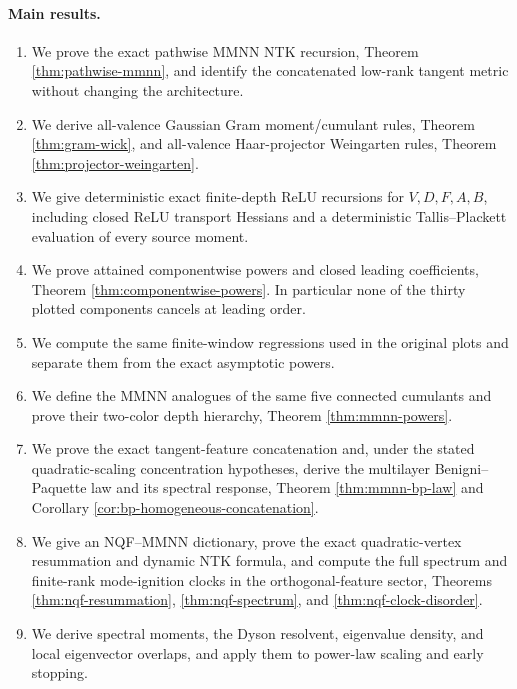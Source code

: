 \documentclass{article}
\begin{document}
\paragraph{Main results.}
\begin{enumerate}[leftmargin=1.55em]
\item We prove the exact pathwise MMNN NTK recursion, Theorem
\ref{thm:pathwise-mmnn}, and identify the concatenated low-rank tangent
metric without changing the architecture.
\item We derive all-valence Gaussian Gram moment/cumulant rules, Theorem
\ref{thm:gram-wick}, and all-valence Haar-projector Weingarten rules,
Theorem \ref{thm:projector-weingarten}.
\item We give deterministic exact finite-depth ReLU recursions for
\(V,D,F,A,B\), including closed ReLU transport Hessians and a deterministic
Tallis--Plackett evaluation of every source moment.
\item We prove attained componentwise powers and closed leading
coefficients, Theorem \ref{thm:componentwise-powers}.  In particular none of
the thirty plotted components cancels at leading order.
\item We compute the same finite-window regressions used in the original
plots and separate them from the exact asymptotic powers.
\item We define the MMNN analogues of the same five connected cumulants and
prove their two-color depth hierarchy, Theorem \ref{thm:mmnn-powers}.
\item We prove the exact tangent-feature concatenation and, under the stated
quadratic-scaling concentration hypotheses, derive the multilayer
Benigni--Paquette law and its spectral response, Theorem
\ref{thm:mmnn-bp-law} and Corollary
\ref{cor:bp-homogeneous-concatenation}.
\item We give an NQF--MMNN dictionary, prove the exact quadratic-vertex
resummation and dynamic NTK formula, and compute the full spectrum and
finite-rank mode-ignition clocks in the orthogonal-feature sector, Theorems
\ref{thm:nqf-resummation}, \ref{thm:nqf-spectrum}, and
\ref{thm:nqf-clock-disorder}.
\item We derive spectral moments, the Dyson resolvent, eigenvalue density,
and local eigenvector overlaps, and apply them to power-law scaling and early
stopping.
\end{enumerate}
\end{document}
